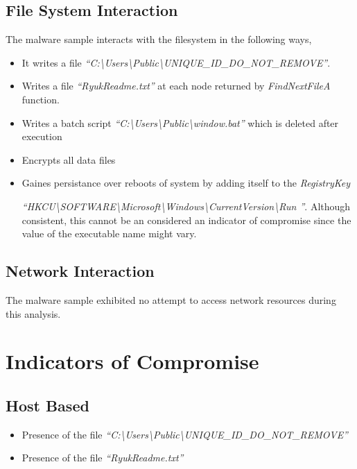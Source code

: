 \documentclass[10pt,a4paper]{article}
\begin{document}
	\subsection{File System Interaction}
	The malware sample interacts with the filesystem in the following ways,
	\begin{itemize}
	\vspace{-1em}
		\item It writes a file \textit{``C:\textbackslash Users\textbackslash Public\textbackslash UNIQUE\_ID\_DO\_NOT\_REMOVE''}.
		\item Writes a file \textit{``RyukReadme.txt''} \cite{ryukReadme} at each node returned by \textit{FindNextFileA} function.
		\item Writes a batch script \textit{``C:\textbackslash Users\textbackslash Public\textbackslash window.bat''} \cite{window} which is deleted after execution
		\item Encrypts all data files
		\item Gaines persistance over reboots of system by adding itself to the \textit{RegistryKey}
		
		\textit{``HKCU\textbackslash SOFTWARE\textbackslash Microsoft\textbackslash Windows\textbackslash CurrentVersion\textbackslash Run ''}. Although consistent, this cannot be an considered an indicator of compromise since the value of the executable name might vary.
	\end{itemize}

	\subsection{Network Interaction}
	The malware sample exhibited no attempt to access network resources during this analysis.

\newpage

\section{Indicators of Compromise}
	\subsection{Host Based}
	\begin{itemize}
	\vspace{-1em}
		\item Presence of the file \textit{``C:\textbackslash Users\textbackslash Public\textbackslash UNIQUE\_ID\_DO\_NOT\_REMOVE''}
		\item Presence of the file \textit{``RyukReadme.txt''}
	\end{itemize}
\end{document}
